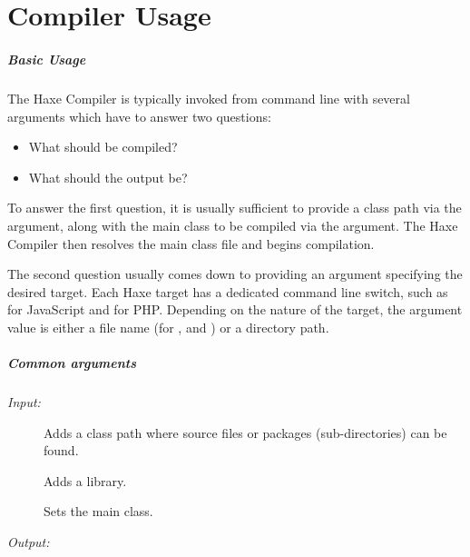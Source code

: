 \chapter{Compiler Usage}
\label{compiler-usage}

\paragraph{Basic Usage}

The Haxe Compiler is typically invoked from command line with several arguments which have to answer two questions:

\begin{itemize}
	\item What should be compiled?
	\item What should the output be?
\end{itemize}
	
To answer the first question, it is usually sufficient to provide a class path via the  argument, along with the main class to be compiled via the  argument. The Haxe Compiler then resolves the main class file and begins compilation.

The second question usually comes down to providing an argument specifying the desired target. Each Haxe target has a dedicated command line switch, such as  for JavaScript and  for PHP. Depending on the nature of the target, the argument value is either a file name (for ,  and ) or a directory path.

\paragraph{Common arguments}

\emph{Input:}

\begin{description}
	\item[] Adds a class path where  source files or packages (sub-directories) can be found.
	\item[] Adds a  library.
	\item[] Sets the main class.
\end{description}

\emph{Output:}

